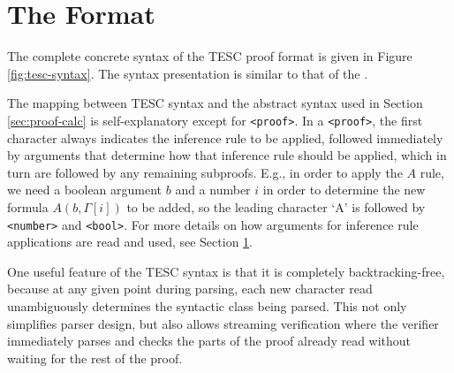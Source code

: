 \documentclass[12pt]{article}
\begin{document}
\section{The Format} \label{sec:format}

The complete concrete syntax of the TESC proof format is given in Figure \ref{fig:tesc-syntax}. The syntax presentation is similar to 
that of the \href{http://www.tptp.org/TPTP/SyntaxBNF.html}{\color{blue}{TPTP syntax}}. 

The mapping between TESC syntax and the abstract syntax used in Section \ref{sec:proof-calc} is self-explanatory except for \texttt{<proof>}. 
In a \texttt{<proof>}, the first character always indicates the inference rule to be applied, followed immediately by arguments that determine 
how that inference rule should be applied, which in turn are followed by any remaining subproofs. E.g., in order to apply the $A$ rule, we need a 
boolean argument $b$ and a number $i$ in order to determine the new formula $A(b, \Gamma[i])$ to be added, so the leading character `A' is followed
by \texttt{<number>} and \texttt{<bool>}. For more details on how arguments for inference rule applications are read and used, see Section 
\ref{sec:format}.

One useful feature of the TESC syntax is that it is completely backtracking-free, because at any 
given point during parsing, each new character read unambiguously determines the syntactic class 
being parsed. This not only simplifies parser design, but also allows streaming verification where 
the verifier immediately parses and checks the parts of the proof already read without waiting for 
the rest of the proof.
\end{document}
